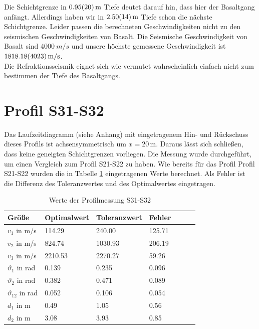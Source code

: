 
Die Schichtgrenze in $\SI{0.95 \pm 0.20}{m}$  Tiefe deutet darauf hin, dass hier der Basaltgang anfängt. Allerdings haben wir in $\SI{2.50 \pm 0.14}{m}$ Tiefe schon die nächste Schichtgrenze. Leider passen die berechneten Geschwindigkeiten nicht zu den seismischen Geschwindigkeiten von Basalt. Die Seismische Geschwindigkeit von Basalt sind $\SI{4000}{m/s}$ und unsere höchste gemessene Geschwindigkeit ist $\SI{1818.18 \pm 40.23}{m/s}$.\\
Die Refraktionsseismik eignet sich wie vermutet wahrscheinlich einfach nicht zum bestimmen der Tiefe des Basaltgangs. 


\section{Profil S31-S32}

Das Laufzeitdiagramm (siehe Anhang) mit eingetragenem Hin- und Rückschuss dieses Profils ist achsensymmetrisch um $x=20$\,m. Daraus lässt sich schließen, dass keine geneigten Schichtgrenzen vorliegen.
Die Messung wurde durchgeführt, um einen Vergleich zum Profil S21-S22 zu haben.
Wie bereits für das Profil Profil S21-S22 wurden die in Tabelle \ref{tab:S31-S32} eingetragenen Werte berechnet. Als Fehler ist die Differenz des Toleranzwertes und des Optimalwertes eingetragen.\\



\begin{table}[!ht]
\centering
\caption{Werte der Profilmessung S31-S32}
\label{tab:S31-S32}
\begin{tabular}{lllllll}
\toprule
Größe   & Optimalwert   & Toleranzwert   & Fehler \\
\midrule
$v_1$ in m/s & 114.29 & 240.00 &  125.71\\
$v_2$ in m/s & 824.74 & 1030.93 & 206.19 \\
$v_3$ in m/s & 2210.53 & 2270.27 & 59.26 \\
$\vartheta_1$ in rad & 0.139 & 0.235 & 0.096  \\
$\vartheta_2$ in rad & 0.382 & 0.471 & 0.089 \\
$\vartheta_{12}$ in rad & 0.052 & 0.106 & 0.054 \\
$d_1$ in m & 0.49 & 1.05 & 0.56 \\
$d_2$ in m & 3.08 & 3.93 & 0.85 \\

\bottomrule
\end{tabular}
\end{table}

